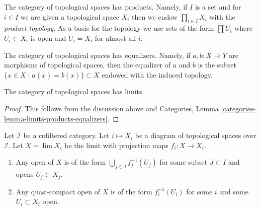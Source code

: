 \noindent
The category of topological spaces has products. Namely, if $I$ is a set
and for $i \in I$ we are given a topological space $X_i$ then we endow
$\prod_{i \in I} X_i$ with the {\it product topology}. As a basis for
the topology we use sets of the form $\prod U_i$ where $U_i \subset X_i$
is open and $U_i = X_i$ for almost all $i$.

\medskip\noindent
The category of topological spaces has equalizers. Namely, if
$a, b : X \to Y$ are morphisms of topological spaces, then the
equalizer of $a$ and $b$ is the subset $\{x \in X \mid a(x) = b(x)\} \subset X$
endowed with the induced topology.

\begin{lemma}
\label{lemma-limits}
The category of topological spaces has limits.
\end{lemma}

\begin{proof}
This follows from the discussion above and
Categories, Lemma \ref{categories-lemma-limits-products-equalizers}.
\end{proof}

\begin{lemma}
\label{lemma-describe-limits}
Let $\mathcal{I}$ be a cofiltered category. Let $i \mapsto X_i$ be a diagram
of topological spaces over $\mathcal{I}$. Let $X = \lim X_i$ be the limit
with projection maps $f_i : X \to X_i$.
\begin{enumerate}
\item Any open of $X$ is of the form $\bigcup_{j \in J} f_j^{-1}(U_j)$
for some subset $J \subset I$ and opens $U_j \subset X_j$.
\item Any quasi-compact open of $X$ is of the form
$f_i^{-1}(U_i)$ for some $i$ and some $U_i \subset X_i$ open.
\end{enumerate}
\end{lemma}


